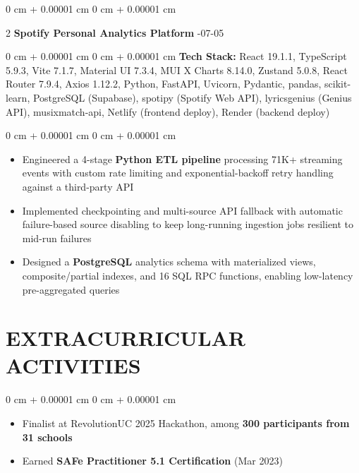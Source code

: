 \documentclass[9pt, letterpaper]{article}
\newenvironment{highlights}{
    \begin{itemize}[
        topsep=0.05 cm,
        parsep=0 pt,
        partopsep=0pt,
        itemsep=0pt,
        leftmargin=10pt
    ]
}{
    \end{itemize}
} %
\newenvironment{onecolentry}{
    \begin{adjustwidth}{
        0 cm + 0.00001 cm}{
        0 cm + 0.00001 cm}
}{
    \end{adjustwidth}
} %
\newenvironment{twocolentry}[2][]{
    \onecolentry
    \def\secondColumn{#2}
    \setcolumnwidth{\fill, 4.5 cm}
    \begin{paracol}{2}
}{
    \switchcolumn \raggedleft \secondColumn
    \end{paracol}
    \endonecolentry
} %
\begin{document}
    \begin{twocolentry}
        {2026-07-05}\textbf{Spotify Personal Analytics Platform}    \end{twocolentry}
    \begin{onecolentry}\textbf{Tech Stack:} React 19.1.1, TypeScript 5.9.3, Vite 7.1.7, Material UI 7.3.4, MUI X Charts 8.14.0, Zustand 5.0.8, React Router 7.9.4, Axios 1.12.2, Python, FastAPI, Uvicorn, Pydantic, pandas, scikit-learn, PostgreSQL (Supabase), spotipy (Spotify Web API), lyricsgenius (Genius API), musixmatch-api, Netlify (frontend deploy), Render (backend deploy) \end{onecolentry}
    \begin{onecolentry}
        \begin{highlights}
            \item Engineered a 4-stage \textbf{Python ETL pipeline} processing 71K+ streaming events with custom rate limiting and exponential-backoff retry handling against a third-party API
            \item Implemented checkpointing and multi-source API fallback with automatic failure-based source disabling to keep long-running ingestion jobs resilient to mid-run failures
            \item Designed a \textbf{PostgreSQL} analytics schema with materialized views, composite/partial indexes, and 16 SQL RPC functions, enabling low-latency pre-aggregated queries
        \end{highlights}
    \end{onecolentry}

\section{EXTRACURRICULAR ACTIVITIES}

    \begin{onecolentry}
        \begin{highlights}
            \item Finalist at RevolutionUC 2025 Hackathon, among \textbf{300 participants from 31 schools}
            \item Earned \textbf{SAFe Practitioner 5.1 Certification} (Mar 2023)
        \end{highlights}
    \end{onecolentry}
\end{document}
